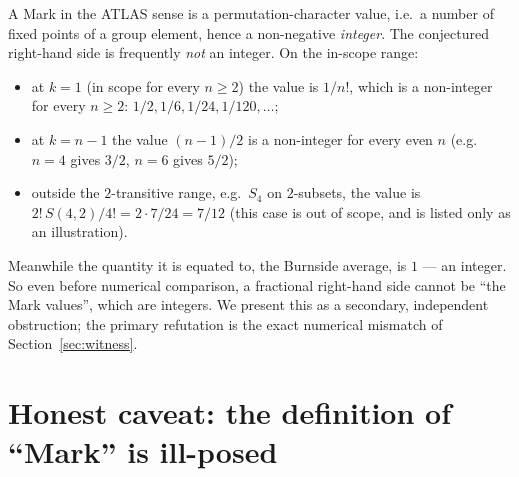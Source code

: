 \documentclass[11pt]{article}
\theoremstyle{definition}
\theoremstyle{remark}
\newcommand{\Stir}[2]{S(#1,#2)}
\begin{document}
A Mark in the ATLAS sense is a permutation-character value, i.e.\ a number of
fixed points of a group element, hence a non-negative \emph{integer}. The
conjectured right-hand side is frequently \emph{not} an integer. On the in-scope
range:
\begin{itemize}
\item at $k=1$ (in scope for every $n \ge 2$) the value is $1/n!$, which is a
  non-integer for every $n \ge 2$: $1/2, 1/6, 1/24, 1/120, \dots$;
\item at $k=n-1$ the value $(n-1)/2$ is a non-integer for every even $n$
  (e.g.\ $n=4$ gives $3/2$, $n=6$ gives $5/2$);
\item outside the $2$-transitive range, e.g.\ $S_4$ on $2$-subsets, the value
  is $2!\,\Stir{4}{2}/4! = 2\cdot 7/24 = 7/12$ (this case is out of scope, and
  is listed only as an illustration).
\end{itemize}
Meanwhile the quantity it is equated to, the Burnside average, is $1$ --- an
integer. So even before numerical comparison, a fractional right-hand side
cannot be ``the Mark values'', which are integers. We present this as a
secondary, independent obstruction; the primary refutation is the exact
numerical mismatch of Section~\ref{sec:witness}.

\section{Honest caveat: the definition of ``Mark'' is ill-posed}
\label{sec:caveat}
\end{document}
